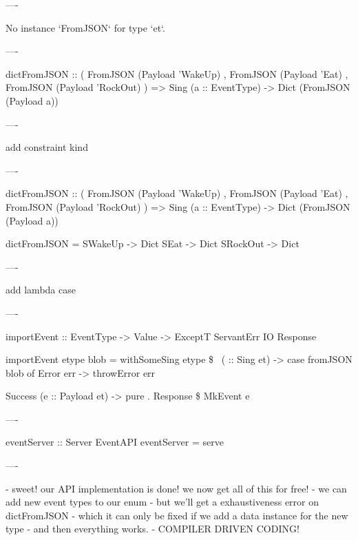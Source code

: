 ----

No instance `FromJSON` for type `et`.

----

\begin{hs}
  dictFromJSON :: ( FromJSON (Payload 'WakeUp)
                  , FromJSON (Payload 'Eat)
                  , FromJSON (Payload 'RockOut)
                  )
               => Sing (a :: EventType)
               -> Dict (FromJSON (Payload a))
\end{hs}

----

add constraint kind

----

\begin{hs}
  dictFromJSON :: ( FromJSON (Payload 'WakeUp)
                  , FromJSON (Payload 'Eat)
                  , FromJSON (Payload 'RockOut)
                  )
               => Sing (a :: EventType)
               -> Dict (FromJSON (Payload a))

  dictFromJSON = \case
    SWakeUp  -> Dict
    SEat     -> Dict
    SRockOut -> Dict
\end{hs}

----

add lambda case

----

\begin{raw}
  importEvent :: EventType
              -> Value
              -> ExceptT ServantErr IO Response

  importEvent etype blob =
    withSomeSing etype \$ \ ( :: Sing et) ->
          case fromJSON blob of
            Error err ->
              throwError err

            Success (e :: Payload et) ->
              pure . Response \$ MkEvent e
\end{raw}

----

\begin{raw}
  eventServer :: Server EventAPI
  eventServer = serve 
\end{raw}

----

- sweet! our API implementation is done! we now get all of this for free!
  - we can add new event types to our enum
  - but we'll get a exhaustiveness error on dictFromJSON
  - which it can only be fixed if we add a data instance for the new type
  - and then everything works.
  - COMPILER DRIVEN CODING!

